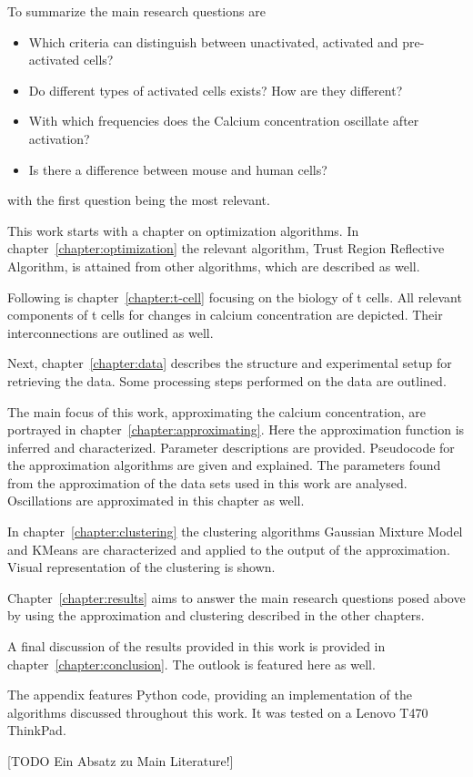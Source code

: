 To summarize the main research questions are
\begin{itemize}
	\item Which criteria can distinguish between unactivated, activated and pre-activated cells?
	\item Do different types of activated cells exists? How are they different?
	\item With which frequencies does the Calcium concentration oscillate after activation?
	\item Is there a difference between mouse and human cells?
\end{itemize}

with the first question being the most relevant.

\newpage
\noindent
This work starts with a chapter on optimization algorithms. In chapter~\ref{chapter:optimization} the relevant algorithm, Trust Region Reflective Algorithm, is attained from other algorithms, which are described as well.

Following is chapter~\ref{chapter:t-cell} focusing on the biology of t cells. All relevant components of t cells for changes in calcium concentration are depicted. Their interconnections are outlined as well.

Next, chapter~\ref{chapter:data} describes the structure and experimental setup for retrieving the data. Some processing steps performed on the data are outlined.

The main focus of this work, approximating the calcium concentration, are portrayed in chapter~\ref{chapter:approximating}. Here the approximation function is inferred and characterized. Parameter descriptions are provided. Pseudocode for the approximation algorithms are given and explained. The parameters found from the approximation of the data sets used in this work are analysed. Oscillations are approximated in this chapter as well.

In chapter~\ref{chapter:clustering} the clustering algorithms Gaussian Mixture Model and KMeans are characterized and applied to the output of the approximation. Visual representation of the clustering is shown.

Chapter~\ref{chapter:results} aims to answer the main research questions posed above by using the approximation and clustering described in the other chapters.

A final discussion of the results provided in this work is provided in chapter~\ref{chapter:conclusion}. The outlook is featured here as well.

The appendix features Python code, providing an implementation of the algorithms discussed throughout this work. It was tested on a Lenovo T470 ThinkPad.

[TODO Ein Absatz zu Main Literature!]